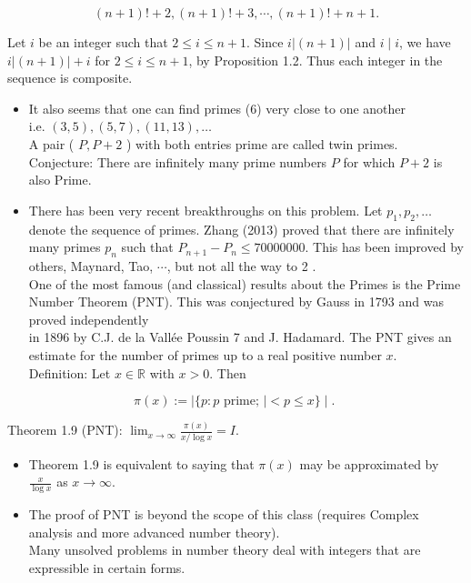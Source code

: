 \documentclass[10pt]{article}
\begin{document}
$$
(n+1)!+2,(n+1)!+3, \cdots,(n+1)!+n+1 .
$$

Let $i$ be an integer such that $2 \leq i \leq n+1$. Since $i|(n+1)|$ and $i \mid i$, we have $i|(n+1)|+i$ for $2 \leq i \leq n+1$, by Proposition 1.2. Thus each integer in the sequence is composite.

\begin{itemize}
  \item It also seems that one can find primes (6) very close to one another\\
i.e. $(3,5),(5,7),(11,13), \ldots$\\
A pair ( $P, P+2$ ) with both entries prime are called twin primes.\\
Conjecture: There are infinitely many prime numbers $P$ for which $P+2$ is also Prime.
  \item There has been very recent breakthroughs on this problem. Let $p_{1}, p_{2}, \ldots$ denote the sequence of primes. Zhang (2013) proved that there are infinitely many primes $p_{n}$ such that $P_{n+1}-P_{n} \leqslant 70000000$. This has been improved by others, Maynard, Tao, $\cdots$, but not all the way to 2 .\\
One of the most famous (and classical) results about the Primes is the Prime Number Theorem (PNT). This was conjectured by Gauss in 1793 and was proved independently\\
in 1896 by C.J. de la Vallée Poussin 7 and J. Hadamard. The PNT gives an estimate for the number of primes up to a real positive number $x$.\\
Definition: Let $x \in \mathbb{R}$ with $x>0$. Then
\end{itemize}

$$
\pi(x):=\mid\{p: p \text { prime; } \mid<p \leqslant x\} \mid \text {. }
$$

Theorem 1.9 (PNT): $\lim _{x \rightarrow \infty} \frac{\pi(x)}{x / \log x}=I$.

\begin{itemize}
  \item Theorem 1.9 is equivalent to saying that $\pi(x)$ may be approximated by $\frac{x}{\log x}$ as $x \rightarrow \infty$.
  \item The proof of PNT is beyond the scope of this class (requires Complex analysis and more advanced number theory).\\
Many unsolved problems in number theory deal with integers that are expressible in certain forms.
\end{itemize}
\end{document}
